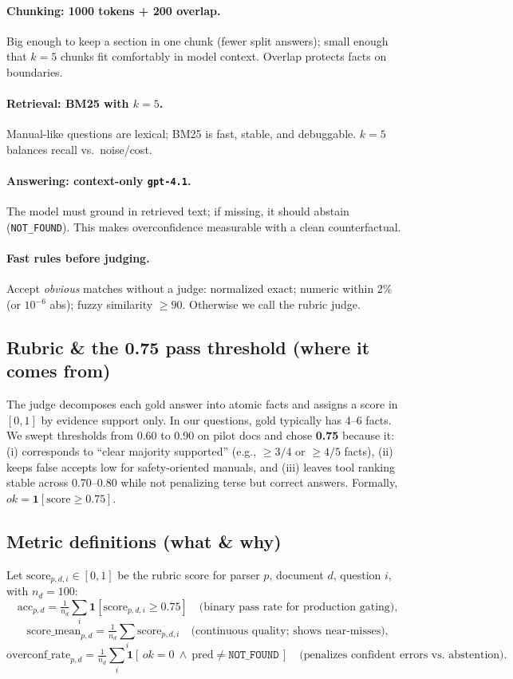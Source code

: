 \documentclass[11pt,a4paper]{article}
\begin{document}
\paragraph{Chunking: 1000 tokens + 200 overlap.}
Big enough to keep a section in one chunk (fewer split answers); small enough that $k=5$ chunks fit comfortably in model context. Overlap protects facts on boundaries.
\paragraph{Retrieval: BM25 with $k=5$.}
Manual-like questions are lexical; BM25 is fast, stable, and debuggable. $k=5$ balances recall vs.\ noise/cost.
\paragraph{Answering: context-only \texttt{gpt-4.1}.}
The model must ground in retrieved text; if missing, it should abstain (\texttt{NOT\_FOUND}). This makes overconfidence measurable with a clean counterfactual.
\paragraph{Fast rules before judging.}
Accept \emph{obvious} matches without a judge: normalized exact; numeric within 2\% (or $10^{-6}$ abs); fuzzy similarity $\ge 90$. Otherwise we call the rubric judge.

\subsection*{Rubric \& the 0.75 pass threshold (where it comes from)}
The judge decomposes each gold answer into atomic facts and assigns a score in $[0,1]$ by evidence support only. In our questions, gold typically has 4--6 facts.
We swept thresholds from 0.60 to 0.90 on pilot docs and chose \textbf{0.75} because it:
(i) corresponds to ``clear majority supported'' (e.g., $\ge 3/4$ or $\ge 4/5$ facts),
(ii) keeps false accepts low for safety-oriented manuals, and
(iii) leaves tool ranking stable across 0.70--0.80 while not penalizing terse but correct answers.
Formally, $ok=\mathbf{1}[\text{score}\ge 0.75]$.

\subsection*{Metric definitions (what \& why)}
Let $\text{score}_{p,d,i}\in[0,1]$ be the rubric score for parser $p$, document $d$, question $i$, with $n_d=100$:
\[
\text{acc}_{p,d}=\tfrac{1}{n_d}\sum_i \mathbf{1}[\text{score}_{p,d,i}\ge 0.75]
\quad\text{(binary pass rate for production gating),}
\]
\[
\text{score\_mean}_{p,d}=\tfrac{1}{n_d}\sum_i \text{score}_{p,d,i}
\quad\text{(continuous quality; shows near-misses),}
\]
\[
\text{overconf\_rate}_{p,d}=\tfrac{1}{n_d}\sum_i \mathbf{1}[\,ok=0 \ \land\ \text{pred}\neq\texttt{NOT\_FOUND}\,]
\quad\text{(penalizes confident errors vs.\ abstention).}
\]
\end{document}
